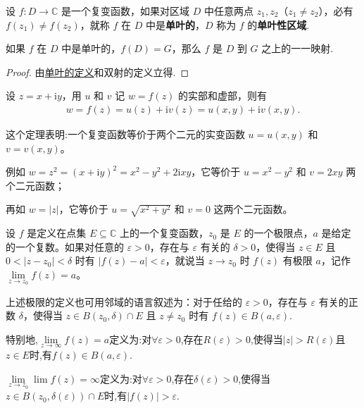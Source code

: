 \documentclass[../../main.tex]{subfiles}%
\begin{document}
\begin{definition}\label{definition:单叶性区域}
设 \( f:D \to \mathbb{C} \) 是一个复变函数，如果对区域 \( D \) 中任意两点 \( z_1, z_2 \)（\( z_1 \neq z_2 \)），必有 \( f(z_1) \neq f(z_2) \)，就称 \( f \) 在 \( D \) 中是\textbf{单叶的}，\( D \) 称为 \( f \) 的\textbf{单叶性区域}.
\end{definition}

\begin{proposition}
如果 \( f \) 在 \( D \) 中是单叶的，\( f(D) = G \)，那么 \( f \) 是 \( D \) 到 \( G \) 之上的一一映射.
\end{proposition}
\begin{proof}

由\hyperref[definition:单叶性区域]{单叶的定义}和双射的定义立得.

\end{proof}

\begin{theorem}
设 $z = x + \mathrm{i}y$，用 $u$ 和 $v$ 记 $w = f(z)$ 的实部和虚部，则有
\begin{align*}
w = f(z) = u(z) + \mathrm{i}v(z)= u(x, y) + \mathrm{i}v(x, y).
\end{align*}
\end{theorem}
\begin{remark}
这个定理表明:一个复变函数等价于两个二元的实变函数 $u = u(x, y)$ 和 $v = v(x, y)$。
\end{remark}
\begin{note}
例如 $w = z^2 = (x + \mathrm{i}y)^2 = x^2 - y^2 + 2\mathrm{i}xy$，它等价于 $u = x^2 - y^2$ 和 $v = 2xy$ 两个二元函数；

再如 $w = |z|$，它等价于 $u = \sqrt{x^2 + y^2}$ 和 $v = 0$ 这两个二元函数。
\end{note}

\begin{definition}
设 $f$ 是定义在点集 $E\subseteq \mathbb{C}$ 上的一个复变函数，$z_0$ 是 $E$ 的一个极限点，$a$ 是给定的一个复数。如果对任意的 $\varepsilon > 0$，存在与 $\varepsilon$ 有关的 $\delta > 0$，使得当 $z \in E$ 且 $0 < |z - z_0| < \delta$ 时有 $|f(z) - a| < \varepsilon$，就说当 $z \to z_0$ 时 $f(z)$ 有极限 $a$，记作 $\lim\limits_{z \to z_0} f(z) = a$。

上述极限的定义也可用邻域的语言叙述为：对于任给的 $\varepsilon > 0$，存在与 $\varepsilon$ 有关的正数 $\delta$，使得当 $z \in B(z_0, \delta) \cap E$ 且 $z \neq z_0$ 时有 $f(z) \in B(a, \varepsilon)$.

特别地,$\lim\limits_{z\rightarrow \infty}f\left( z \right) =a$定义为:对$\forall \varepsilon >0$,存在$R\left( \varepsilon \right) >0$,使得当$\left| z \right|>R\left( \varepsilon \right)$且$z\in E$时,有$f\left( z \right) \in B\left( a,\varepsilon \right).$

$\lim\limits_{z\rightarrow z_0}{\lim}f\left( z \right) =\infty$定义为:对$\forall \varepsilon >0$,存在$\delta \left( \varepsilon \right) >0$,使得当$z\in B\left( z_0,\delta \left( \varepsilon \right) \right) \cap E$时,有$\left| f\left( z \right) \right|>\varepsilon.$
\end{definition}
\end{document}

